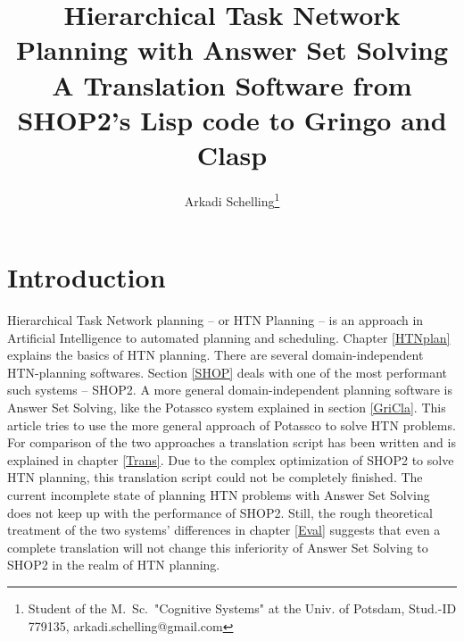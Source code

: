\documentclass[10pt,a4paper]{article}
\author{Arkadi Schelling\footnote{Student of the M.~Sc.~"Cognitive Systems" at the Univ. of Potsdam, Stud.-ID 779135, arkadi.schelling@gmail.com}}
\title{Hierarchical Task Network Planning with Answer Set Solving\linebreak
	\normalsize A Translation Software from SHOP2's Lisp code to Gringo and Clasp}
\begin{document}
\maketitle
\hfill
\tableofcontents %
\pagebreak

\section{Introduction}
Hierarchical Task Network planning -- or HTN Planning -- is an approach in Artificial Intelligence to automated planning and scheduling. Chapter \ref{HTNplan} explains the basics of HTN planning. There are several domain-independent HTN-planning softwares. Section \ref{SHOP} deals with one of the most performant such systems -- SHOP2. A more general domain-independent planning software is Answer Set Solving, like the Potassco system explained in section \ref{GriCla}. This article tries to use the more general approach of Potassco to solve HTN problems. For comparison of the two approaches a translation script has been written and is explained in chapter \ref{Trans}. Due to the complex optimization of SHOP2 to solve HTN planning, this translation script could not be completely finished. The current incomplete state of planning HTN problems with Answer Set Solving does not keep up with the performance of SHOP2. Still, the rough theoretical treatment of the two systems' differences in chapter \ref{Eval} suggests that even a complete translation will not change this inferiority of Answer Set Solving to SHOP2 in the realm of HTN planning.
\end{document}
